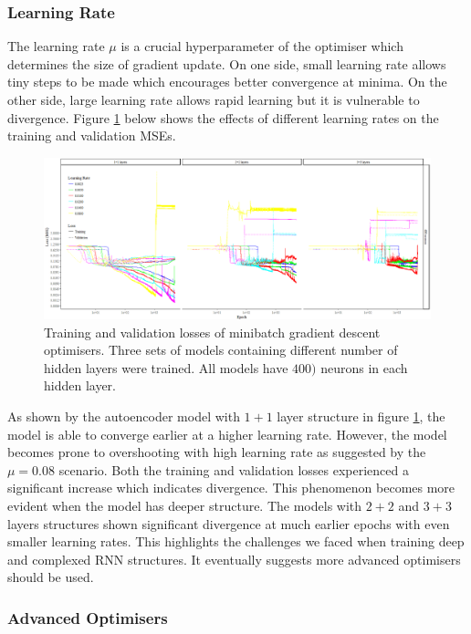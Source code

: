\documentclass[11pt]{article} %
\theoremstyle{plain}
\theoremstyle{definition}
\begin{document}
\subsubsection{Learning Rate}

The learning rate \(\mu\) is a crucial hyperparameter of the optimiser which determines the size of gradient update. On one side, small learning rate allows tiny steps to be made which encourages better convergence at minima. On the other side, large learning rate allows rapid learning but it is vulnerable to divergence. Figure \ref{fig:learning_rate} below shows the effects of different learning rates on the training and validation MSEs.

\begin{figure}[H]
	\centering
	\includegraphics[width=1\textwidth]{learning_rate.PNG}
	\caption{Training and validation losses of minibatch gradient descent optimisers. Three sets of models containing different number of hidden layers were trained. All models have \(400)\) neurons in each hidden layer.}
	\label{fig:learning_rate}
\end{figure}

As shown by the autoencoder model with \(1+1\) layer structure in figure \ref{fig:learning_rate}, the model is able to converge earlier at a higher learning rate. However, the model becomes prone to overshooting with high learning rate as suggested by the \(\mu=0.08\) scenario. Both the training and validation losses experienced a significant increase which indicates divergence. This phenomenon becomes more evident when the model has deeper structure. The models with \(2+2\) and \(3+3\) layers structures shown significant divergence at much earlier epochs with even smaller learning rates. This highlights the challenges we faced when training deep and complexed RNN structures. It eventually suggests more advanced optimisers should be used.

\subsubsection{Advanced Optimisers}
\end{document}
